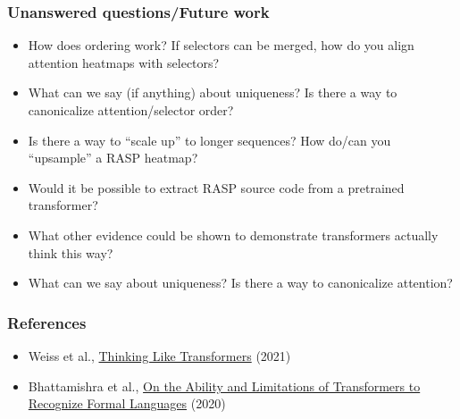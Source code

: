 \documentclass[mathserif,notheorems]{beamer}
\theoremstyle{plain} %
\theoremstyle{definition} %
\begin{document}
  \begin{frame}
    \frametitle{Unanswered questions/Future work}
    \begin{itemize}
      \item How does ordering work? If selectors can be merged, how do you align attention heatmaps with selectors?
      \item What can we say (if anything) about uniqueness? Is there a way to canonicalize attention/selector order?
      \item Is there a way to ``scale up'' to longer sequences? How do/can you ``upsample'' a RASP heatmap?
      \item Would it be possible to extract RASP source code from a pretrained transformer?
      \item What other evidence could be shown to demonstrate transformers actually think this way?
      \item What can we say about uniqueness? Is there a way to canonicalize attention?
    \end{itemize}
  \end{frame}

  \begin{frame}
    \frametitle{References}
    \begin{itemize}
      \item Weiss et al., \href{https://arxiv.org/pdf/2009.11264v2.pdf}{Thinking Like Transformers} (2021)
      \item Bhattamishra et al., \href{https://arxiv.org/pdf/2009.11264v2.pdf}{On the Ability and Limitations of Transformers to Recognize Formal Languages} (2020)
    \end{itemize}
  \end{frame}
\end{document}
